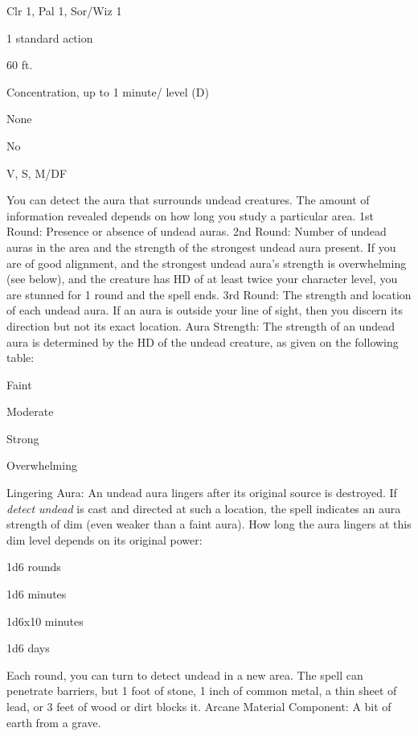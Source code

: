 
\begin{description*}
\item[Level:] Clr 1, Pal 1, Sor/Wiz 1
\item[Casting Time:] 1 standard action
\item[Range:] 60 ft.
\item[Duration:] Concentration, up to 1 minute/ level (D)
\item[Saving Throw:] None
\item[Spell Resistance:] No
\item[Components:] V, S, M/DF
\end{description*}

You can detect the aura that surrounds undead creatures. The amount of information
revealed depends on how long you study a particular area.
1st Round: Presence or absence of undead auras.
2nd Round: Number of undead auras in the area and the strength of the
strongest undead aura present. If you are of good alignment, and the strongest
undead aura's strength is overwhelming (see below), and the creature has HD of
at least twice your character level, you are stunned for 1 round and the spell
ends.
3rd Round: The strength and location of each undead aura. If an aura is
outside your line of sight, then you discern its direction but not its exact location.
Aura Strength: The strength of an undead aura is determined by the HD
of the undead creature, as given on the following table:
\begin{description*}
\item[1 or Lower] Faint
\item[2-4] Moderate
\item[5-10] Strong
\item[11 or Higher] Overwhelming
\end{description*}
Lingering Aura: An undead aura lingers after its original source is destroyed.
If \textit{detect undead} is cast and directed at such a location, the spell indicates
an aura strength of dim (even weaker than a faint aura). How long the aura lingers
at this dim level depends on its original power:
\begin{description*}
\item[Faint] 1d6 rounds
\item[Moderate] 1d6 minutes
\item[Strong] 1d6x10 minutes
\item[Overwhelming] 1d6 days
\end{description*}
Each round, you can turn to detect undead in a new area. The spell can penetrate
barriers, but 1 foot of stone, 1 inch of common metal, a thin sheet of lead, or
3 feet of wood or dirt blocks it.
Arcane Material Component: A bit of earth from a grave.
